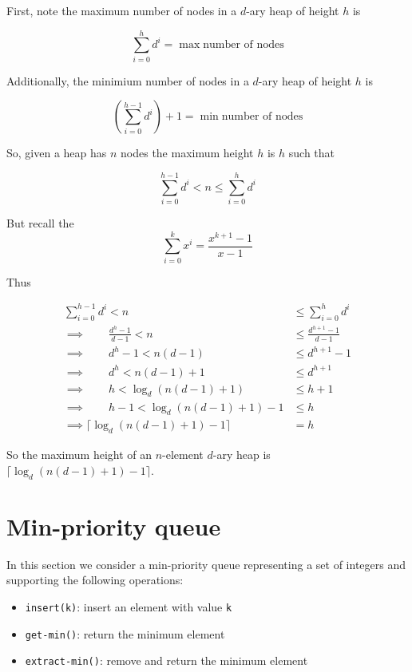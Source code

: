 \documentclass[paper=a4, fontsize=11pt]{scrartcl} %
\numberwithin{equation}{section} %
\numberwithin{figure}{section} %
\numberwithin{table}{section} %
\begin{document}
First, note the maximum number of nodes in a $d$-ary heap of height $h$ is

\[\sum_{i = 0}^h d^i = \max \textrm{number of nodes}\]

Additionally, the minimium number of nodes in a $d$-ary heap of height $h$ is

\[\left(\sum_{i = 0}^{h-1} d^i\right) +1 = \min \textrm{number of nodes}\]

So, given a heap has $n$ nodes the maximum height $h$ is $h$ such that

\[\sum_{i = 0}^{h-1} d^i < n \leq \sum_{i = 0}^h d^i\]

But recall the
\[\sum_{i = 0}^k x^i = \frac{x^{k+1}-1}{x-1}\]

Thus

\begin{align*}
\sum_{i = 0}^{h-1} d^i < n &\leq \sum_{i = 0}^h d^i \\
\implies \qquad{} \frac{d^{h}-1}{d-1} < n &\leq \frac{d^{h+1}-1}{d-1} \\
\implies \qquad{} d^{h}-1 < n(d - 1) &\leq d^{h+1}-1 \\
\implies \qquad{} d^{h} < n(d - 1) +1 &\leq d^{h+1} \\
\implies \qquad{} h < \log_d(n(d - 1) + 1) &\leq h + 1 \\
\implies \qquad{} h - 1 < \log_d(n(d - 1) + 1) - 1 &\leq h \\
\implies \lceil \log_d(n(d - 1) + 1) - 1 \rceil &= h
\end{align*}

So the maximum height of an $n$-element $d$-ary heap is $\lceil \log_d(n(d - 1) + 1) - 1 \rceil$.

 
 \section{Min-priority queue}
 
 In this section we consider a min-priority queue representing a set of integers and supporting the following operations:
 \begin{itemize}
 \item \texttt{insert(k)}: insert an element with value \texttt{k}
 \item \texttt{get-min()}: return the minimum element
 \item \texttt{extract-min()}: remove and return the minimum element
 \end{itemize}
 
\end{document}
